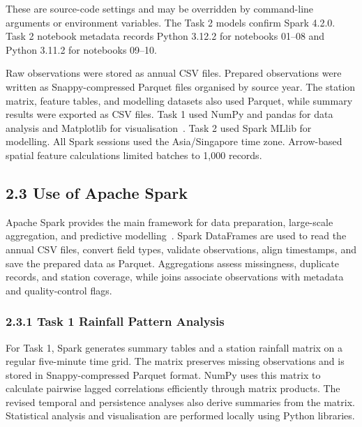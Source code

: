 \documentclass[11pt,a4paper]{article}
\begin{document}
These are source-code settings and may be overridden by command-line arguments or environment variables. The Task 2 models confirm Spark 4.2.0. Task 2 notebook metadata records Python 3.12.2 for notebooks 01–08 and Python 3.11.2 for notebooks 09–10.


Raw observations were stored as annual CSV files. Prepared observations were written as Snappy-compressed Parquet files organised by source year. The station matrix, feature tables, and modelling datasets also used Parquet, while summary results were exported as CSV files. Task 1 used NumPy and pandas for data analysis and Matplotlib for visualisation~\citep{numpy_docs,pandas_docs,matplotlib_docs}. Task 2 used Spark MLlib for modelling. All Spark sessions used the Asia/Singapore time zone. Arrow-based spatial feature calculations limited batches to 1,000 records.


\subsection*{2.3 Use of Apache Spark}
{}


Apache Spark provides the main framework for data preparation, large-scale aggregation, and predictive modelling~\citep{spark_sql,spark_ml}. Spark DataFrames are used to read the annual CSV files, convert field types, validate observations, align timestamps, and save the prepared data as Parquet. Aggregations assess missingness, duplicate records, and station coverage, while joins associate observations with metadata and quality-control flags.


\subsubsection*{2.3.1 Task 1 Rainfall Pattern Analysis}
{}


For Task 1, Spark generates summary tables and a station rainfall matrix on a regular five-minute time grid. The matrix preserves missing observations and is stored in Snappy-compressed Parquet format. NumPy uses this matrix to calculate pairwise lagged correlations efficiently through matrix products. The revised temporal and persistence analyses also derive summaries from the matrix. Statistical analysis and visualisation are performed locally using Python libraries.
\end{document}

